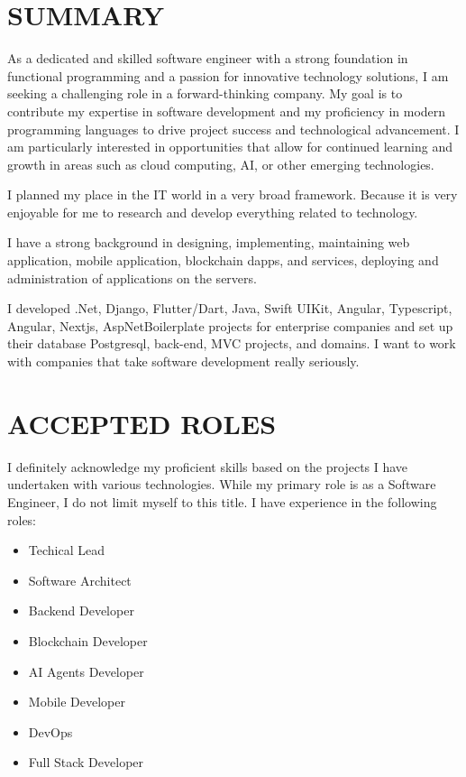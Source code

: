 \documentclass[line,margin]{res}
\begin{document}
\address{emre.yildiz.dev@hotmail.com}
\address{\href{https://linkedin.com/in/emre-yildiz-297ab0242}{ Linkedin}} 


 
\begin{resume}
 
\noindent\hrulefill
\section{SUMMARY}  As a dedicated and skilled software engineer with a strong foundation in functional programming and a passion for innovative technology solutions, I am seeking a challenging role in a forward-thinking company. My goal is to contribute my expertise in software development and my proficiency in modern programming languages to drive project success and technological advancement. I am particularly interested in opportunities that allow for continued learning and growth in areas such as cloud computing, AI, or other emerging technologies.
                
I planned my place in the IT world in a very broad framework. Because it is very enjoyable for me to research and develop everything related to technology.

I have a strong background in designing, implementing, maintaining web application, mobile application, blockchain dapps, and services, deploying and administration of applications  on the servers.

I developed .Net, Django, Flutter/Dart, Java, Swift UIKit, Angular, Typescript, Angular, Nextjs, AspNetBoilerplate projects for enterprise companies and set up their database Postgresql, back-end, MVC projects, and domains.
I want to work with companies that take software development really seriously.

\noindent\hrulefill

\section{\textbf{ACCEPTED ROLES}} I definitely acknowledge my proficient skills based on the projects I have undertaken with various technologies. While my primary role is as a Software Engineer, I do not limit myself to this title. I have experience in the following roles:
\begin{itemize}
\item Techical Lead
\item Software Architect
\item Backend Developer
\item Blockchain Developer
\item AI Agents Developer
\item Mobile Developer
\item DevOps
\item Full Stack Developer
\end{itemize}


\end{resume}
\end{document}
